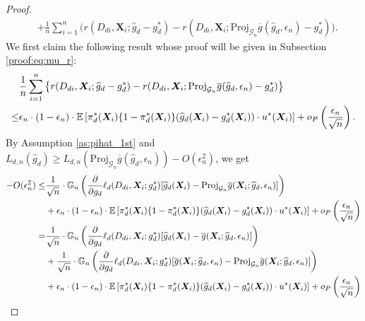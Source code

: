 \documentclass[11pt]{article}
\numberwithin{equation}{section}
\begin{document}
\begin{proof}
\begin{align*}
		&+\frac{1}{n}\sum_{i=1}^n\bigg(r(D_{di},\boldsymbol{X}_{i}; \widehat{g}_d-g^*_d)-r(D_{di},\boldsymbol{X}_{i}; \text{Proj}_{\mathcal{G}_{n}}\overline{g}(\widehat{g}_d,\epsilon_n)-g^*_d)\bigg).
	\end{align*}
	We first claim the following result whose proof will be given in Subsection \ref{proof:eq:mu_r}:
	\begin{align}\label{eq:mu_r}
		&\frac{1}{n}\sum_{i=1}^n\left\{r(D_{di},\boldsymbol{X}_{i};\widehat{g}_d-g^*_d)-r(D_{di},\boldsymbol{X}_{i};\text{Proj}_{\mathcal{G}_n}\overline{g}(\widehat{g}_d,\epsilon_n)-g^*_d)\right\}\\
		\leq&\epsilon_n \cdot (1-\epsilon_n)\cdot   \mathbb{E}\left[\pi_d^*(\boldsymbol{X}_i)\{1-\pi_d^*(\boldsymbol{X}_i)\}(\widehat{g}_d(\boldsymbol{X}_{i})-g^*_d(\boldsymbol{X}_{i})) \cdot u^*(\boldsymbol{X}_{i})\right]+o_P\left(\frac{\epsilon_n}{\sqrt{n}}\right). \notag
	\end{align}
	By Assumption \ref{as:pihat_1st} and $L_{d,n}(\widehat{g}_d)\geq L_{d,n}(\text{Proj}_{\mathcal{G}_{n}}\overline{g}(\widehat{g}_d,\epsilon_n))-O(\epsilon^2_n)$,  we get
	\begin{align} \label{eq:Lpihat-Lpibar}
		-O(\epsilon_n^2)\leq & \frac{1}{\sqrt{n}}\cdot  \mathbb{G}_n\left(\frac{\partial}{\partial g_d}\ell_d(D_{di},\boldsymbol{X}_{i};g^*_d)[ \widehat{g}_d(\boldsymbol{X}_{i})-\text{Proj}_{\mathcal{G}_n}\overline{g}(\boldsymbol{X}_{i};\widehat{g}_d,\epsilon_n)]\right) \\
		&+\epsilon_n \cdot (1-\epsilon_n)\cdot   \mathbb{E}\left[\pi_d^*(\boldsymbol{X}_i)\{1-\pi_d^*(\boldsymbol{X}_i)\}(\widehat{g}_d(\boldsymbol{X}_{i})-g^*_d(\boldsymbol{X}_{i})) \cdot u^*(\boldsymbol{X}_{i})\right]+o_P\left(\frac{\epsilon_n}{\sqrt{n}}\right)  \notag\\
		= &\frac{1}{\sqrt{n}}\cdot  \mathbb{G}_n\left(\frac{\partial}{\partial g_d}\ell_d(D_{di},\boldsymbol{X}_{i};g^*_d)[ \widehat{g}_d(\boldsymbol{X}_{i})-\overline{g}(\boldsymbol{X}_{i};\widehat{g}_d,\epsilon_n)]\right) \notag\\
		&+\frac{1}{\sqrt{n}}\cdot  \mathbb{G}_n\left(\frac{\partial}{\partial g_d}\ell_d(D_{di},\boldsymbol{X}_{i};g^*_d)[\overline{g}(\boldsymbol{X}_{i};\widehat{g}_d,\epsilon_n)-\text{Proj}_{\mathcal{G}_n}\overline{g}(\boldsymbol{X}_{i};\widehat{g}_d,\epsilon_n)]\right)\notag\\
		&+\epsilon_n \cdot (1-\epsilon_n)\cdot   \mathbb{E}\left[\pi_d^*(\boldsymbol{X}_i)\{1-\pi_d^*(\boldsymbol{X}_i)\}(\widehat{g}_d(\boldsymbol{X}_{i})-g^*_d(\boldsymbol{X}_{i})) \cdot u^*(\boldsymbol{X}_{i})\right]+o_P\left(\frac{\epsilon_n}{\sqrt{n}}\right)   \notag\\

\end{align}
\end{proof}
\end{document}

